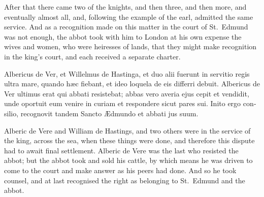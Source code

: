 \documentclass[10pt]{book}
\begin{document}
\begin{paracol}{2}
\switchcolumn

After that there came two of the knights, and then three, and then more, and eventually almost all, and, following the example of the earl, admitted the same service. And as a recognition made on this matter in the court of St.\ Edmund was not enough, the abbot took with him to London at his own expense the wives and women, who were heiresses of lands, that they might make recognition in the king's court, and each received a separate charter.

\switchcolumn*

\begin{otherlanguage}{latin}
Albericus de Ver, et Willelmus de Hastinga, et duo alii fuerunt in servitio regis ultra mare, quando h\ae{}c fiebant, et ideo loquela de eis differri debuit. Albericus de Ver ultimus erat qui abbati resistebat; abbas vero averia ejus cepit et vendidit, unde oportuit eum venire in curiam et respondere sicut pares sui. Inito ergo consilio, recognovit tandem Sancto \AE{}dmundo et abbati jus suum.
\end{otherlanguage}

\switchcolumn

Alberic de Vere and William de Hastings, and two others were in the service of the king, across the sea, when these things were done, and therefore this dispute had to await final settlement. Alberic de Vere was the last who resisted the abbot; but the abbot took and sold his cattle, by which means he was driven to come to the court and make answer as his peers had done. And so he took counsel, and at last recognised the right as belonging to St.\ Edmund and the abbot.

\switchcolumn*


\end{paracol}
\end{document}
